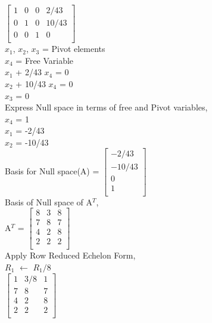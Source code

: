 \documentclass{article}
\begin{document}
  $\begin{bmatrix}
    1 & 0 & 0 & 2/43\\
    0 & 1 & 0 & 10/43 \\
    0 & 0 & 1 & 0  \\
    \end{bmatrix}$ \\
    
    $x_1$, $x_2$, $x_3$ = Pivot elements \\
    
    $x_4$ = Free Variable \\
    $x_1$ + 2/43 $x_4$ = 0 \\
    $x_2$ + 10/43 $x_4$ = 0 \\
    $x_3$  = 0 \\

Express Null space in terms of free and Pivot variables,\\
$x_4$ = 1\\
$x_1$ = -2/43 \\
$x_2$ = -10/43 \\

Basis for Null space(A) = $\begin{bmatrix}
    -2/43 \\
    -10/43 \\
    0 \\
    1 \\
    \end{bmatrix}$ \\

Basis of Null space of A$^T$, \\

A$^T$ = $\begin{bmatrix}
    8 & 3 & 8 \\
    7 & 8 & 7 \\
    4 & 2 & 8 \\
    2 & 2 & 2 \\
    \end{bmatrix}$ \\
    
    Apply Row Reduced Echelon Form, \\
    
$R_1$ $\leftarrow$ $R_1/8$ \\

$\begin{bmatrix}
    1 & 3/8 & 1 \\
    7 & 8 & 7 \\
    4 & 2 & 8 \\
    2 & 2 & 2 \\
    \end{bmatrix}$ \\
  
\end{document}
